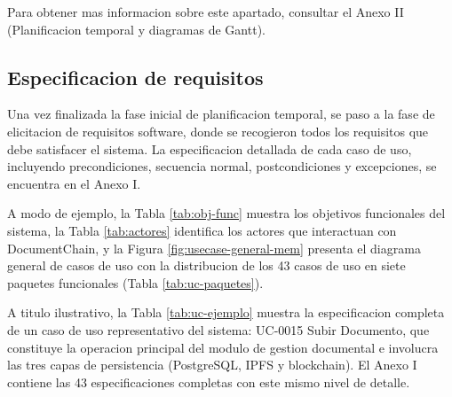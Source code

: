 \documentclass[11pt, a4paper]{article}
\begin{document}
Para obtener mas informacion sobre este apartado, consultar el Anexo II (Planificacion temporal y diagramas de Gantt).

\subsection{Especificacion de requisitos}

Una vez finalizada la fase inicial de planificacion temporal, se paso a la fase de elicitacion de requisitos software, donde se recogieron todos los requisitos que debe satisfacer el sistema. La especificacion detallada de cada caso de uso, incluyendo precondiciones, secuencia normal, postcondiciones y excepciones, se encuentra en el Anexo I.

A modo de ejemplo, la Tabla \ref{tab:obj-func} muestra los objetivos funcionales del sistema, la Tabla \ref{tab:actores} identifica los actores que interactuan con DocumentChain, y la Figura \ref{fig:usecase-general-mem} presenta el diagrama general de casos de uso con la distribucion de los 43 casos de uso en siete paquetes funcionales (Tabla \ref{tab:uc-paquetes}).

A titulo ilustrativo, la Tabla \ref{tab:uc-ejemplo} muestra la especificacion completa de un caso de uso representativo del sistema: UC-0015 Subir Documento, que constituye la operacion principal del modulo de gestion documental e involucra las tres capas de persistencia (PostgreSQL, IPFS y blockchain). El Anexo I contiene las 43 especificaciones completas con este mismo nivel de detalle.
\end{document}
